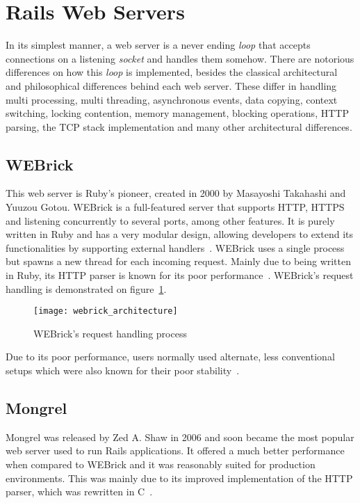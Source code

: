 \section{Rails Web Servers} %
\label{tech:sec:rails_webservers}
In its simplest manner, a web server is a never ending \textit{loop} that accepts connections on a listening \textit{socket} and handles them somehow. There are notorious differences on how this \textit{loop} is implemented, besides the classical architectural and philosophical differences behind each web server. These differ in handling multi processing, multi threading, asynchronous events, data copying, context switching, locking contention, memory management, blocking operations, HTTP parsing, the TCP stack implementation and many other architectural differences.


\subsection{WEBrick}
This web server is Ruby's pioneer, created in 2000 by Masayoshi Takahashi and Yuuzou Gotou. WEBrick is a full-featured server that supports HTTP, HTTPS and listening concurrently to several ports, among other features. It is purely written in Ruby and has a very modular design, allowing developers to extend its functionalities by supporting external handlers~\cite{webrick_guide}.
WEBrick uses a single process but spawns a new thread for each incoming request. Mainly due to being written in Ruby, its HTTP parser is known for its poor performance~\cite{ruby_webservers}. WEBrick's request handling is demonstrated on figure~\ref{fig:webrick_architecture}.
\begin{figure}[h!]
  \centering
    \texttt{[image: webrick\_architecture]}
  \caption{WEBrick's request handling process}
  \label{fig:webrick_architecture}
\end{figure}
Due to its poor performance, users normally used alternate, less conventional setups which were also known for their poor stability~\cite{ruby_webservers}.


\subsection{Mongrel}
Mongrel was released by Zed A. Shaw in 2006 and soon became the most popular web server used to run Rails applications. It offered a much better performance when compared to WEBrick and it was reasonably suited for production environments. This was mainly due to its improved implementation of the HTTP parser, which was rewritten in C~\cite{mongrel_server_production}.

